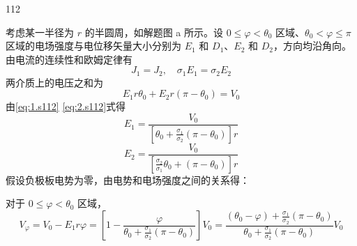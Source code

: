 \begin{solution}{112}
    \begin{subsolution}
        考虑某一半径为 $r$ 的半圆周，如解题图 a 所示。设 $0 \leq \varphi < \theta_{0}$ 区域、$\theta_{0} < \varphi \leq \pi$ 区域的电场强度与电位移矢量大小分别为 $E_{1}$ 和 $D_{1}$、$E_{2}$ 和 $D_{2}$，方向均沿角向。由电流的连续性和欧姆定律有
        \begin{equation}
            J_{1} = J_{2}, \quad \sigma_{1} E_{1} = \sigma_{2} E_{2}
            \label{eq:1.s112}
        \end{equation}
        两介质上的电压之和为
        \begin{equation}
            E_{1} r \theta_{0} + E_{2} r (\pi - \theta_{0}) = V_{0}
            \label{eq:2.s112}
        \end{equation}
        由\eqref{eq:1.s112} \eqref{eq:2.s112}式得
        \begin{equation}
            E_{1} = \frac{V_{0}}{\left[ \theta_{0} + \frac{\sigma_{1}}{\sigma_{2}} (\pi - \theta_{0}) \right] r}
            \label{eq:3.s112}
        \end{equation}
        \begin{equation}
            E_{2} = \frac{V_{0}}{\left[ \frac{\sigma_{2}}{\sigma_{1}} \theta_{0} + (\pi - \theta_{0}) \right] r}
            \label{eq:4.s112}
        \end{equation}
        假设负极板电势为零，由电势和电场强度之间的关系得：

        对于 $0 \leq \varphi < \theta_0$ 区域，
        \begin{equation}
            V_{\varphi} = V_{0} - E_{1} r \varphi = \left[ 1 - \frac{\varphi}{\theta_{0} + \frac{\sigma_{1}}{\sigma_{2}} (\pi - \theta_{0})} \right] V_{0} = \frac{\left(\theta_{0} - \varphi\right) + \frac{\sigma_{1}}{\sigma_{2}} \left(\pi - \theta_{0}\right)}{\theta_{0} + \frac{\sigma_{1}}{\sigma_{2}} \left(\pi - \theta_{0}\right)} V_{0}
            \label{eq:5.s112}
        \end{equation}


\end{subsolution}
\end{solution}
